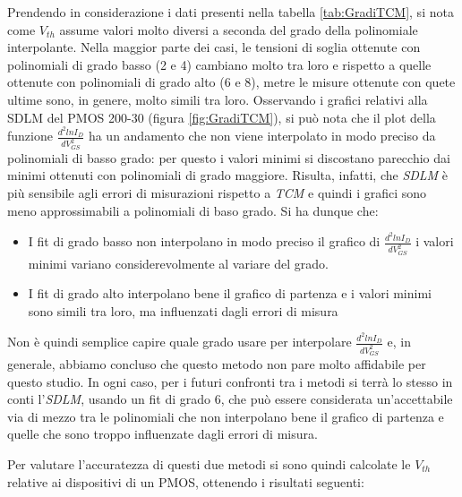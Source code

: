 \documentclass[12pt, letterpaper]{book}
\begin{document}
Prendendo in considerazione i dati presenti nella tabella \ref{tab:GradiTCM}, si nota come $V_{th}$ assume valori molto diversi a seconda del grado della polinomiale interpolante. Nella maggior parte dei casi, le tensioni di soglia ottenute con polinomiali di grado basso (2 e 4) cambiano molto tra loro e rispetto a quelle ottenute con polinomiali di grado alto (6 e 8), metre le misure ottenute con quete ultime sono, in genere, molto simili tra loro. Osservando i grafici relativi alla SDLM del PMOS 200-30 (figura \ref{fig:GradiTCM}), si può nota che il plot della funzione $\frac{d^2lnI_D}{dV_{GS}^2}$ ha un andamento che non viene interpolato in modo preciso da polinomiali di basso grado: per questo i valori minimi si discostano parecchio dai minimi ottenuti con polinomiali di grado maggiore. Risulta, infatti, che \emph{SDLM} è più sensibile agli errori di misurazioni rispetto a \emph{TCM} e quindi i grafici sono meno approssimabili a polinomiali di baso grado. Si ha dunque che:
\begin{itemize}
  \item I fit di grado basso non interpolano in modo preciso il grafico di $\frac{d^2lnI_D}{dV_{GS}^2}$ i valori minimi variano considerevolmente al variare del grado.
  \item I fit di grado alto interpolano bene il grafico di partenza e i valori minimi sono simili tra loro, ma influenzati dagli errori di misura
\end{itemize}

Non è quindi semplice capire quale grado usare per interpolare $\frac{d^2lnI_D}{dV_{GS}^2}$ e, in generale, abbiamo concluso che questo metodo non pare molto affidabile per questo studio. In ogni caso, per i futuri confronti tra i metodi si terrà lo stesso in conti l'\emph{SDLM}, usando un fit di grado 6, che può essere considerata un'accettabile via di mezzo tra le polinomiali che non interpolano bene il grafico di partenza e quelle che sono troppo influenzate dagli errori di misura.









Per valutare l'accuratezza di questi due metodi si sono quindi calcolate le $V_{th}$ relative ai dispositivi di un PMOS, ottenendo i risultati seguenti:
\end{document}
